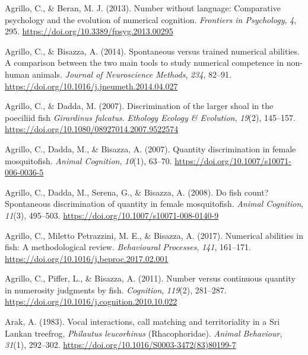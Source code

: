 \documentclass[
  ,pub,floatsintext]{apa6}
\newlength{\cslhangindent}
\newlength{\cslentryspacingunit} %
\newenvironment{CSLReferences}[2] %
 {%
  \setlength{\parindent}{0pt}
  \ifodd #1
  \let\oldpar\par
  \def\par{\hangindent=\cslhangindent\oldpar}
  \fi
  \setlength{\parskip}{#2\cslentryspacingunit}
 }%
 {}
\begin{document}
\hypertarget{refs}{}
\begin{CSLReferences}{1}{0}
\leavevmode{}%
Agrillo, C., \& Beran, M. J. (2013). Number without language: Comparative psychology and the evolution of numerical cognition. \emph{Frontiers in Psychology}, \emph{4}, 295. \url{https://doi.org/10.3389/fpsyg.2013.00295}

\leavevmode{}%
Agrillo, C., \& Bisazza, A. (2014). Spontaneous versus trained numerical abilities. {A} comparison between the two main tools to study numerical competence in non-human animals. \emph{Journal of Neuroscience Methods}, \emph{234}, 82--91. \url{https://doi.org/10.1016/j.jneumeth.2014.04.027}

\leavevmode{}%
Agrillo, C., \& Dadda, M. (2007). Discrimination of the larger shoal in the poeciliid fish \emph{{Girardinus} falcatus}. \emph{Ethology Ecology \& Evolution}, \emph{19}(2), 145--157. \url{https://doi.org/10.1080/08927014.2007.9522574}

\leavevmode{}%
Agrillo, C., Dadda, M., \& Bisazza, A. (2007). Quantity discrimination in female mosquitofish. \emph{Animal Cognition}, \emph{10}(1), 63--70. \url{https://doi.org/10.1007/s10071-006-0036-5}

\leavevmode{}%
Agrillo, C., Dadda, M., Serena, G., \& Bisazza, A. (2008). Do fish count? {Spontaneous} discrimination of quantity in female mosquitofish. \emph{Animal Cognition}, \emph{11}(3), 495--503. \url{https://doi.org/10.1007/s10071-008-0140-9}

\leavevmode{}%
Agrillo, C., Miletto Petrazzini, M. E., \& Bisazza, A. (2017). Numerical abilities in fish: {A} methodological review. \emph{Behavioural Processes}, \emph{141}, 161--171. \url{https://doi.org/10.1016/j.beproc.2017.02.001}

\leavevmode{}%
Agrillo, C., Piffer, L., \& Bisazza, A. (2011). Number versus continuous quantity in numerosity judgments by fish. \emph{Cognition}, \emph{119}(2), 281--287. \url{https://doi.org/10.1016/j.cognition.2010.10.022}

\leavevmode{}%
Arak, A. (1983). Vocal interactions, call matching and territoriality in a {Sri Lankan} treefrog, \emph{{Philautus} leucorhinus} ({Rhacophoridae}). \emph{Animal Behaviour}, \emph{31}(1), 292--302. \url{https://doi.org/10.1016/S0003-3472(83)80199-7}


\end{CSLReferences}
\end{document}
